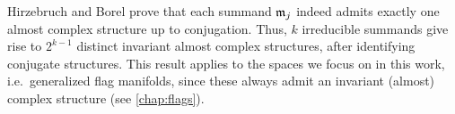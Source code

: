 Hirzebruch and Borel prove that each summand $\mathfrak{m}_j$ indeed admits exactly one almost complex structure up to conjugation. Thus, $k$ irreducible summands give rise to $2^{k-1}$ distinct invariant almost complex structures, after identifying conjugate structures. This result applies to the spaces we focus on in this work, i.e.~generalized flag manifolds, since these always admit an invariant (almost) complex structure (see \cref{chap:flags}).